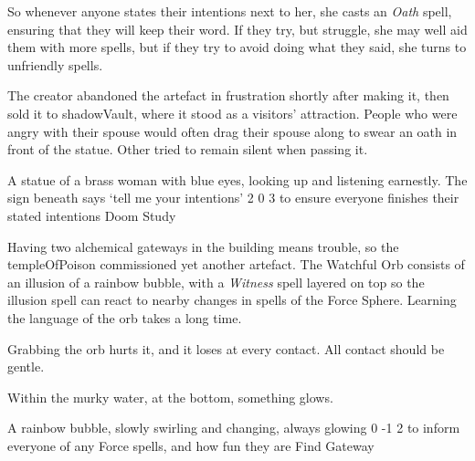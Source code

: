 \begin{multicols}{2}
\begin{exampletext}
  So whenever anyone states their intentions next to her, she casts an \textit{Oath} spell, ensuring that they will keep their word.
  If they try, but struggle, she may well aid them with more spells, but if they try to avoid doing what they said, she turns to unfriendly spells.

  The creator abandoned the \gls{artefact} in frustration shortly after making it, then sold it to \gls{shadowVault}, where it stood as a visitors' attraction.
  People who were angry with their spouse would often drag their spouse along to swear an oath in front of the statue.
  Other tried to remain silent when passing it.
\end{exampletext}

  {A statue of a brass woman with blue eyes, looking up and listening earnestly.
  The sign beneath says `tell me your intentions'}%
  {2}%
  {0}%
  {3}%
  {to ensure everyone finishes their stated intentions}%
  {Doom Study}%
  {
    \setcounter{Fate}{2}
    \setcounter{Water}{2}
    \setcounter{Empathy}{2}
    \setcounter{Cultivation}{1}
  }%

\showStdSpells[
  \setcounter{diceNo}{0}
]


\begin{exampletext}
  Having two alchemical gateways in the building means trouble, so the \gls{templeOfPoison} commissioned yet another \gls{artefact}.
  The Watchful Orb consists of an illusion of a rainbow bubble, with a \textit{Witness} spell layered on top so the illusion spell can react to nearby changes in spells of the Force Sphere.
  Learning the language of the orb takes a long time.

  Grabbing the orb hurts it, and it loses  at every contact.
  All contact should be gentle.
\end{exampletext}

\begin{boxtext}
  Within the murky water, at the bottom, something glows.
\end{boxtext}

  {A rainbow bubble, slowly swirling and changing, always glowing}%
  {0}%
  {-1}%
  {2}%
  {to inform everyone of any Force spells, and how fun they are}%
  {Find Gateway}%
  {
    \setcounter{Air}{3}
    \setcounter{Fire}{3}
    \setcounter{Earth}{1}
    \setcounter{Academics}{2}
    \setcounter{Xenomology}{2}
  }%


\end{multicols}
